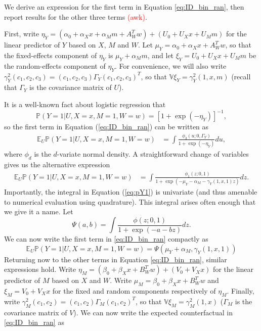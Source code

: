 \documentclass{article}
\newcommand{\bP}{\mathbb{P}}
\newcommand{\bE}{\mathbb{E}}
\newcommand{\bV}{\mathbb{V}}
\begin{document}
We derive an expression for the first term in Equation \eqref{eq:ID_bin_ran}, then report results for the other three terms \textcolor{red}{(awk)}. 

First, write $\eta_Y = (\alpha_0 + \alpha_X x + \alpha_M m + A_W^T w) + (U_0 + U_X x + U_M m)$ for the linear predictor of $Y$ based on $X$, $M$ and $W$. Let $\mu_Y = \alpha_0 + \alpha_X x + A_W^T w$, so that the fixed-effects component of $\eta_Y$ is $\mu_Y + \alpha_M m$, and let $\xi_Y = U_0 + U_X x + U_M m$ be the random-effects component of $\eta_Y$. For convenience, we will also write $\gamma^2_Y(c_1, c_2, c_3) = (c_1, c_2, c_3) \Gamma_Y (c_1, c_2, c_3)^T$, so that $\bV \xi_Y = \gamma^2_Y(1, x, m)$ (recall that $\Gamma_Y$ is the covariance matrix of $U$).

It is a well-known fact about logistic regression that
%
\begin{equation}
    \bP \left( Y=1 |U, X=x, M=1, W=w \right) = \left[1 + \exp(-\eta_Y)\right]^{-1},
\end{equation}
%
so the first term in Equation (\ref{eq:ID_bin_ran}) can be written as
%
\begin{align}
    \bE_U \bP \left( Y=1 |U, X=x, M=1, W=w \right) & = \int \frac{\phi_3(u; 0, \Gamma_Y)}{1 + \exp(-\eta_Y)} du, \label{eq:pY1_bad}
\end{align}
%
where $\phi_d$ is the $d$-variate normal density. A straightforward change of variables gives us the alternative expression
%
\begin{align}
    \bE_U \bP \left( Y=1 |U, X=x, M=1, W=w \right) & = \int \frac{\phi_1(z; 0, 1)}{1 + \exp(-\mu_Y - \alpha_M - \gamma_Y(1, x, 1) z)} dz. \label{eq:pY1}
\end{align}
%
Importantly, the integral in Equation (\ref{eq:pY1}) is univariate (and thus amenable to numerical evaluation using quadrature). This integral arises often enough that we give it a name. Let
%
\begin{equation}
    \Psi(a, b) = \int \frac{\phi(z; 0, 1)}{1 + \exp(-a - b z)} dz.
\end{equation}
%
We can now write the first term in \eqref{eq:ID_bin_ran} compactly as
%
\begin{equation}
    \bE_U \bP \left( Y=1 |U, X=x, M=1, W=w \right) = \Psi(\mu_Y + \alpha_M, \gamma_Y(1, x, 1))
\end{equation}
%
Returning now to the other terms in Equation \eqref{eq:ID_bin_ran}, similar expressions hold. Write $\eta_M = (\beta_0 + \beta_X x + B_W^T w) + (V_0 + V_X x)$ for the linear predictor of $M$ based on $X$ and $W$. Write $\mu_M = \beta_0 + \beta_X x + B_W^T w$ and $\xi_M = V_0 + V_X x$ for the fixed and random components respectively of $\eta_M$. Finally, write $\gamma^2_M(c_1, c_2) = (c_1, c_2) \Gamma_M (c_1, c_2)^T$, so that $\bV \xi_M = \gamma^2_M(1, x)$ ($\Gamma_M$ is the covariance matrix of $V$). We can now write the expected counterfactual in \eqref{eq:ID_bin_ran} as
\end{document}
